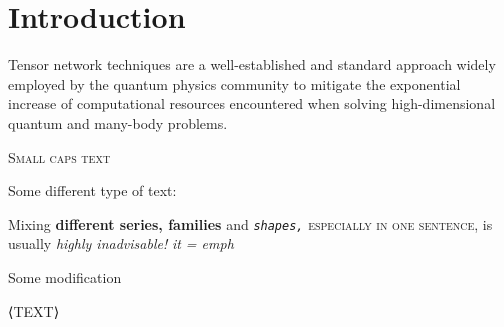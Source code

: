 \chapter{Introduction}
\label{chap:intro}
Tensor network techniques are a well-established \cite{Fannes1992,White1992,Schollwock2011,Vidal2003,VerstraeteCirac2004,vonDelftTNNotes,tensornetwork.org} and standard approach widely employed by the quantum physics community to mitigate the exponential increase of computational resources encountered when solving high-dimensional quantum and many-body problems.\vspace{\baselineskip}\\


\textsc{Small caps text}
{}


Some different type of text:\hfill

Mixing \textbf{different series, \textsf{families}} and
\textsl{\texttt{shapes,}} \textsc{especially in one sentence,}
is usually \emph{highly inadvisable!}\textit{ it = emph}

Some modification 

\MakeTextUppercase{⟨text⟩}









    








